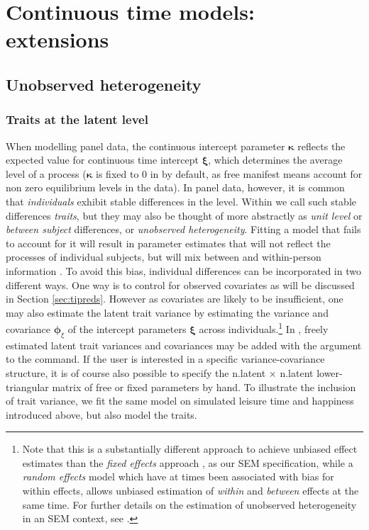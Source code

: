 \documentclass[nojss]{jss}\usepackage[]{graphicx}\usepackage[]{color}
\begin{document}
\section{Continuous time models: extensions} \label{sec:extensions}\nopagebreak
\subsection{Unobserved heterogeneity}\nopagebreak
\subsubsection{Traits at the latent level} \label{sec:heterogeneity} \nopagebreak
When modelling panel data, the continuous intercept parameter $\boldsymbol{\kappa}$ reflects the expected value for continuous time intercept $\boldsymbol{\xi}$, which determines the average level of a process ($\boldsymbol{\kappa}$ is fixed to 0 in  by default, as free manifest means account for non zero equilibrium levels in the data). In panel data, however, it is common that \textit{individuals} exhibit stable differences in the level. Within  we call such stable differences \textit{traits}, but they may also be thought of more abstractly as \textit{unit level} or \textit{between subject} differences, or \textit{unobserved heterogeneity}. Fitting a model that fails to account for it will result in parameter estimates that will not reflect the processes of individual subjects, but will mix between and within-person information \citep{balestra1966pooling, oud2000continuous, halaby2004panel}. 
To avoid this bias, individual differences can be incorporated in two different ways. One way is to control for observed covariates as will be discussed in Section \ref{sec:tipreds}. However as covariates are likely to be insufficient, one may also estimate the latent trait variance by estimating the variance and covariance $\boldsymbol{\phi}_{\xi}$ of the intercept parameters $\boldsymbol{\xi}$ across individuals.\footnote{Note that this is a substantially different approach to achieve unbiased effect estimates than the \textit{fixed effects} approach \citep[see for example][]{mundlak1978pooling}, as our SEM specification, while a \textit{random effects} model which have at times been associated with bias for within effects, allows unbiased estimation of \textit{within} and \textit{between} effects at the same time. For further details on the estimation of unobserved heterogeneity in an SEM context, see \citet{bollen2010general}.} In , freely estimated latent trait variances and covariances may be added with the argument  to the  command. If the user is interested in a specific variance-covariance structure, it is of course also possible to specify the n.latent $\times$ n.latent lower-triangular matrix of free or fixed parameters by hand. To illustrate the inclusion of trait variance, we fit the same model on simulated leisure time and happiness introduced above, but also model the traits. 
\end{document}
